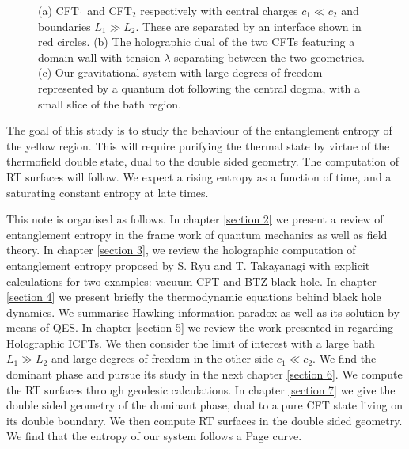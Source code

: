 \begin{figure}
     \hfill
     \begin{subfigure}[b]{0.3\textwidth}
         \centering
         \caption{}
         \label{QM 3}
     \end{subfigure}
     \hfill
    \caption{(a) CFT$_1$  and CFT$_2$ respectively with central charges $c_1\ll c_2$ and boundaries $L_1\gg L_2$. These are separated by an interface shown in red circles. (b) The holographic dual of the two CFTs featuring a domain wall with tension $\lambda$ separating between the two geometries. (c) Our gravitational system with large degrees of freedom represented by a quantum dot following the central dogma, with a small slice of the bath region.}
    \label{QM fig}
\end{figure}

The goal of this study is to study the behaviour of the entanglement entropy of the yellow region. This will require purifying the thermal state by virtue of the thermofield double state, dual to the double sided  geometry\cite{ISRAEL1976107}. The computation of  RT surfaces will follow. We expect a rising entropy as a function of time, and a saturating constant entropy at late times.

This note is organised as follows. In chapter \ref{section 2} we present a review of entanglement entropy in the frame work of quantum mechanics as well as field theory. In chapter \ref{section 3}, we review the holographic computation of entanglement entropy proposed by S. Ryu and T. Takayanagi\cite{Ryu, Ryu_2006} with explicit calculations for two examples: vacuum CFT and BTZ black hole. In chapter \ref{section 4} we present briefly the thermodynamic equations behind black hole dynamics. We summarise Hawking information paradox as well as its solution by means of QES. In chapter \ref{section 5} we review the work presented in \cite{Bachas_2021} regarding Holographic ICFTs. We then consider the limit of interest with a large bath $L_1\gg L_2$ and large degrees of freedom in the other side $c_1\ll c_2$. We find the dominant phase and pursue its study in the next chapter \ref{section 6}. We compute the RT surfaces through geodesic calculations. In chapter \ref{section 7} we give the double sided geometry of the dominant phase, dual to a pure CFT state living on its double boundary. We then compute RT surfaces in the double sided geometry. We find that the entropy of our system follows a Page curve. 
